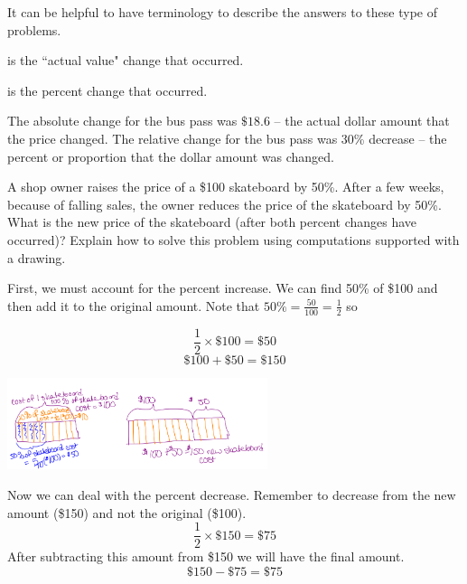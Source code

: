 \documentclass{ximera}
\begin{document}
It can be helpful to have terminology to describe the answers to these type of problems.

\begin{definition}

 is the ``actual value" change that occurred. 

 is the percent change that occurred.  
\end{definition}

The absolute change for the bus pass was $\$18.6$ -- the actual dollar amount that the price changed. The relative change for the bus pass was 30\% decrease -- the percent or proportion that the dollar amount was changed.

\begin{example}
A shop owner raises the price of a \$100 skateboard by 50\%. After a few weeks, because of falling sales, the owner reduces the price of the skateboard by 50\%.
What is the new price of the skateboard (after both percent changes have occurred)? Explain how to solve this problem using computations supported with a drawing.

\begin{explanation}
  First, we must account for the percent increase. We can find 50\% of \$100 and then add it to the original amount.  Note that $50\%=\frac{50}{100}=\frac{1}{2}$ so 

$$
\frac{1}{2} \times \$100 = \$50
$$
$$
\$ 100 + \$50 = \$ 150
$$

\begin{image}
    \includegraphics[width=3in]{skateboard1.png}
\end{image}

Now we can deal with the percent decrease. Remember to decrease from the new amount (\$150) and not the original (\$100).
$$
\frac{1}{2} \times \$150 = \$75
$$
After subtracting this amount from \$150 we will have the final amount.
$$
\$ 150 - \$75 = \$ 75
$$


\end{explanation}
\end{example}
\end{document}
